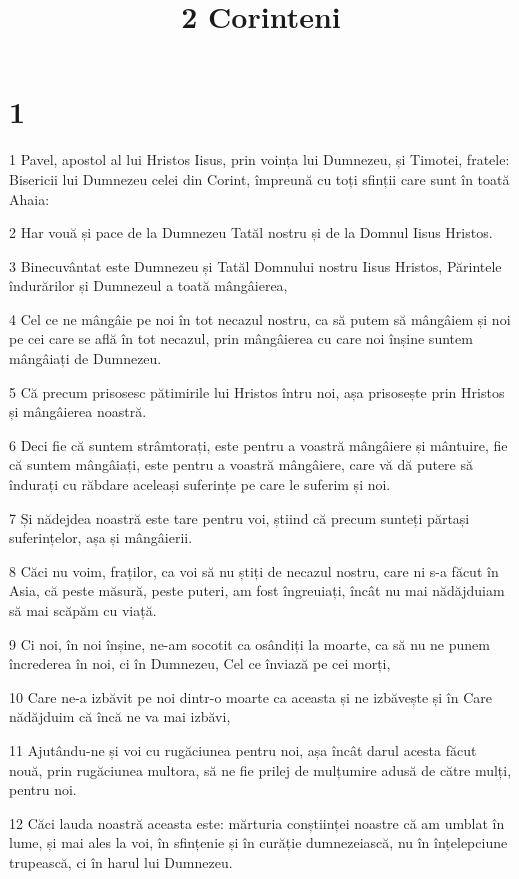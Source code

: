 

\title{2 Corinteni}


\chapter{1}

\par 1 Pavel, apostol al lui Hristos Iisus, prin voința lui Dumnezeu, și Timotei, fratele: Bisericii lui Dumnezeu celei din Corint, împreună cu toți sfinții care sunt în toată Ahaia:
\par 2 Har vouă și pace de la Dumnezeu Tatăl nostru și de la Domnul Iisus Hristos.
\par 3 Binecuvântat este Dumnezeu și Tatăl Domnului nostru Iisus Hristos, Părintele îndurărilor și Dumnezeul a toată mângâierea,
\par 4 Cel ce ne mângâie pe noi în tot necazul nostru, ca să putem să mângâiem și noi pe cei care se află în tot necazul, prin mângâierea cu care noi înșine suntem mângâiați de Dumnezeu.
\par 5 Că precum prisosesc pătimirile lui Hristos întru noi, așa prisosește prin Hristos și mângâierea noastră.
\par 6 Deci fie că suntem strâmtorați, este pentru a voastră mângâiere și mântuire, fie că suntem mângâiați, este pentru a voastră mângâiere, care vă dă putere să îndurați cu răbdare aceleași suferințe pe care le suferim și noi.
\par 7 Și nădejdea noastră este tare pentru voi, știind că precum sunteți părtași suferințelor, așa și mângâierii.
\par 8 Căci nu voim, fraților, ca voi să nu știți de necazul nostru, care ni s-a făcut în Asia, că peste măsură, peste puteri, am fost îngreuiați, încât nu mai nădăjduiam să mai scăpăm cu viață.
\par 9 Ci noi, în noi înșine, ne-am socotit ca osândiți la moarte, ca să nu ne punem încrederea în noi, ci în Dumnezeu, Cel ce înviază pe cei morți,
\par 10 Care ne-a izbăvit pe noi dintr-o moarte ca aceasta și ne izbăvește și în Care nădăjduim că încă ne va mai izbăvi,
\par 11 Ajutându-ne și voi cu rugăciunea pentru noi, așa încât darul acesta făcut nouă, prin rugăciunea multora, să ne fie prilej de mulțumire adusă de către mulți, pentru noi.
\par 12 Căci lauda noastră aceasta este: mărturia conștiinței noastre că am umblat în lume, și mai ales la voi, în sfințenie și în curăție dumnezeiască, nu în înțelepciune trupească, ci în harul lui Dumnezeu.
